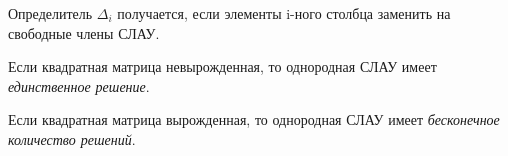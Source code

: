 \begin{note}
  Определитель $\Delta_i$ получается, если элементы i-ного столбца заменить на свободные члены СЛАУ.
\end{note}

Если квадратная матрица невырожденная, то однородная СЛАУ имеет \textit{единственное решение}. 

Если квадратная матрица вырожденная, то однородная СЛАУ имеет \textit{бесконечное количество решений}. 

